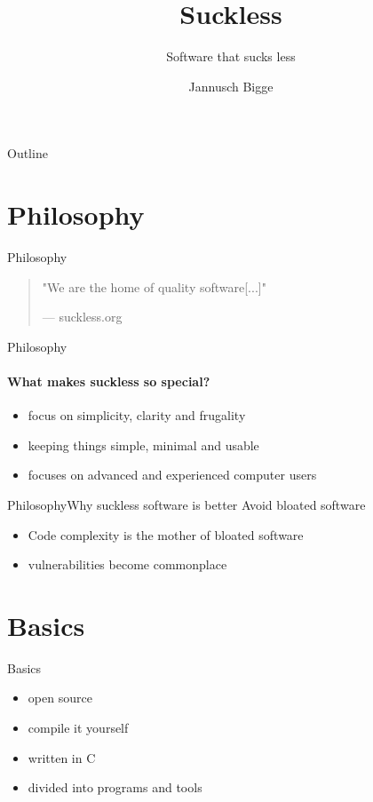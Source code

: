 \documentclass[10pt,graphics,aspectratio=169,table]{beamer}
\title{Suckless}
\subtitle{Software that sucks less}
\author{Jannusch Bigge}
\begin{document}
\begin{frame}[plain]
    \maketitle
\end{frame}

\begin{frame}{Outline}
    \tableofcontents
\end{frame}

\section{Philosophy}
\begin{frame}{Philosophy}
	\begin{quotation}
		"We are the home of quality software[...]"
		
		\begin{flushright}
			--- suckless.org
		\end{flushright}
	\end{quotation}
\end{frame}


\begin{frame}{Philosophy}
	\framesubtitle{What makes suckless so special?}
	\begin{itemize}
		\item focus on simplicity, clarity and frugality
		\item keeping things simple, minimal and usable
		\item focuses on advanced and experienced computer users
	\end{itemize}
\end{frame}

\begin{frame}{Philosophy}{Why suckless software is better}
	Avoid bloated software
	\begin{itemize}
		\item Code complexity is the mother of bloated software
		\item vulnerabilities become commonplace
		\end{itemize}
\end{frame}

\section{Basics}

\begin{frame}{Basics}
	\begin{itemize}
		\item open source
		\item compile it yourself
		\item written in C
		\item divided into programs and tools
	\end{itemize}	
\end{frame}
\end{document}
